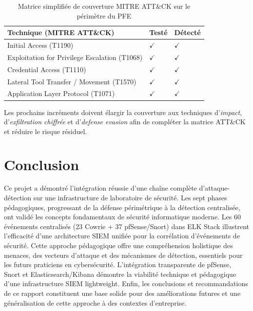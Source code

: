 \documentclass[12pt,a4paper,openany]{report}
\newcommand{\tableheadcolor}{\rowcolor{tableheadbg}}
\begin{document}
	\begin{table}[H]
		\centering
		\small
		\renewcommand{\arraystretch}{1.25}
		\setlength{\arrayrulewidth}{0.5pt}
		\begin{tabular}{p{5.2cm} >{\centering\arraybackslash}p{2.2cm} >{\centering\arraybackslash}p{2.2cm}}
			\arrayrulecolor{tableborder}
			\hline
			\tableheadcolor
			\textcolor{tableheadfg}{\textbf{Technique (MITRE ATT\&CK)}} &
			\textcolor{tableheadfg}{\textbf{Testé}} &
			\textcolor{tableheadfg}{\textbf{Détecté}} \\
			\hline
			\rowcolor{tablerowalt}
			Initial Access (T1190) & $\checkmark$ & $\checkmark$ \\
			Exploitation for Privilege Escalation (T1068) & $\checkmark$ & $\checkmark$ \\
			\rowcolor{tablerowalt}
			Credential Access (T1110) & $\checkmark$ & $\checkmark$ \\
			Lateral Tool Transfer / Movement (T1570) & $\checkmark$ & $\checkmark$ \\
			\rowcolor{tablerowalt}
			Application Layer Protocol (T1071) & $\checkmark$ & $\checkmark$ \\
			\hline
		\end{tabular}
		\caption{Matrice simplifiée de couverture MITRE ATT\&CK sur le périmètre du PFE}
		\label{tab:conclusion-mitre-coverage}
	\end{table}
	
	Les prochains incréments doivent élargir la couverture aux techniques d'\textit{impact}, d'\textit{exfiltration chiffrée} et d'\textit{defense evasion} afin de compléter la matrice ATT\&CK et réduire le risque résiduel.
	
	\section{Conclusion}
	
	Ce projet a démontré l'intégration réussie d'une chaîne complète d'attaque-détection
	sur une infrastructure de laboratoire de sécurité. Les sept phases pédagogiques,
	progressant de la défense périmétrique à la détection centralisée, ont validé les
	concepts fondamentaux de sécurité informatique moderne. Les 60 événements centralisés
	(23 Cowrie + 37 pfSense/Snort) dans ELK Stack illustrent l'efficacité d'une architecture
	SIEM unifiée pour la corrélation d'événements de sécurité. Cette approche pédagogique
	offre une compréhension holistique des menaces, des vecteurs d'attaque et des mécanismes
	de détection, essentiels pour les futurs praticiens en cybersécurité. L'intégration
	transparente de pfSense, Snort et Elasticsearch/Kibana démontre la viabilité technique
	et pédagogique d'une infrastructure SIEM lightweight. Enfin, les conclusions et
	recommandations de ce rapport constituent une base solide pour des améliorations futures
	et une généralisation de cette approche à des contextes d'entreprise.
	
\end{document}
